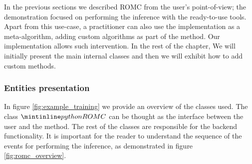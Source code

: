 In the previous sections we described ROMC from the user's
point-of-view; the demonstration focused on performing the inference
with the ready-to-use tools. Apart from this use-case, a practitioner
can also use the implementation as a meta-algorithm, adding custom
algorithms as part of the method. Our implementation allows such
intervention. In the rest of the chapter, We will initially present
the main internal classes and then we will exhibit how to add custom
methods.

\subsubsection{Entities presentation}

In figure \ref{fig:example_training} we provide an overview of the
classes used. The class $\pinline{ROMC}$ can be thought as the
interface between the user and the method. The rest of the classes are
responsible for the backend functionality. It is important for the
reader to understand the sequence of the events for performing the
inference, as demonstrated in figure \ref{fig:romc_overview}.

